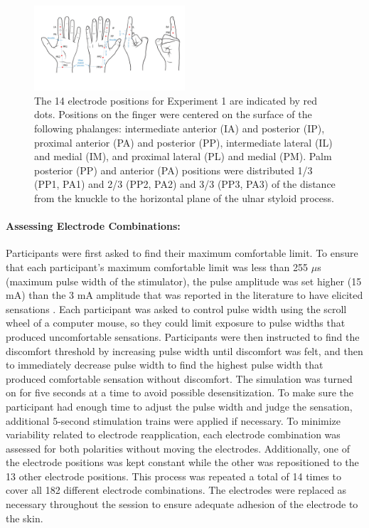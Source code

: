 \documentclass[10pt]{iopart}
\begin{document}
\begin{figure}
  \centering
  \includegraphics[width=0.5\textwidth,trim={1.5cm 5cm 1cm 2.2cm},clip]{fig/Image_Hand.jpg}
  \caption{The 14 electrode positions for Experiment 1 are indicated by red dots. Positions on the finger were centered on the surface of the following phalanges: intermediate anterior (IA) and posterior (IP), proximal anterior (PA) and posterior (PP), intermediate lateral (IL) and medial (IM), and proximal lateral (PL) and medial (PM). Palm posterior (PP) and anterior (PA) positions were distributed 1/3 (PP1, PA1) and 2/3 (PP2, PA2) and 3/3 (PP3, PA3) of the distance from the knuckle to the horizontal plane of the ulnar styloid process.}
  \label{fig:electrodes_positions}
\end{figure}


\paragraph{Assessing Electrode Combinations:}
Participants were first asked to find their maximum comfortable limit. To ensure that each participant's maximum comfortable limit was less than 255 $\mu$s (maximum pulse width of the stimulator), the pulse amplitude was set higher (15 mA) than the 3 mA amplitude that was reported in the literature to have elicited sensations \cite{pena_channel-hopping_2021, dalonzo_electro-cutaneous_2018}. Each participant was asked to control pulse width using the scroll wheel of a computer mouse, so they could limit exposure to pulse widths that produced uncomfortable sensations. Participants were then instructed to find the discomfort threshold by increasing pulse width until discomfort was felt, and then to immediately decrease pulse width to find the highest pulse width that produced comfortable sensation without discomfort. The simulation was turned on for five seconds at a time to avoid possible desensitization. To make sure the participant had enough time to adjust the pulse width and judge the sensation, additional 5-second stimulation trains were applied if necessary. To minimize variability related to electrode reapplication, each electrode combination was assessed for both polarities without moving the electrodes. Additionally, one of the electrode positions was kept constant while the other was repositioned to the 13 other electrode positions. This process was repeated a total of 14 times to cover all 182 different electrode combinations. The electrodes were replaced as necessary throughout the session to ensure adequate adhesion of the electrode to the skin. 
\end{document}
